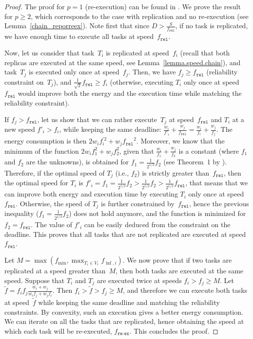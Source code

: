 \documentclass[a4paper]{article}
\theoremstyle{plain}
\theoremstyle{definition}
\theoremstyle{remark}
\newcommand{\fmin}{\ensuremath{f_{\min}}\xspace}
\newcommand{\finf}{\ensuremath{f_{\inf,i}}\xspace}
\newcommand{\fr}{\ensuremath{f_{\texttt{rel}}}\xspace}
\newcommand{\freex}{\ensuremath{f_{\texttt{re-ex}}}\xspace}
\begin{document}
\begin{proof}
  The proof for $p=1$ (re-execution) can be found in \cite{rr7757}.
  We prove the result for $p \geq 2$, which corresponds to the case
  with replication and no re-execution (see
  Lemma~\ref{chain_reporreex}).
Note first that since $D > \frac{S}{\fr}$, if no task is
  replicated, we have enough time to execute all tasks at speed~\fr.

  Now, let us consider that task~$T_i$ is replicated at
  speed~$f_i$ (recall that both replicas are executed at the same
  speed, see Lemma~\ref{lemma.speed.chain}), and task~$T_j$ is executed
  only once at speed~$f_j$. Then, we have
  $f_j\geq\fr$ (reliability constraint on~$T_j$), and 
  $\frac{1}{\sqrt{2}}\fr \geq f_i$ (otherwise, executing $T_i$ only once at speed~\fr would improve
  both the energy and the execution time while matching the
  reliability constraint).

  If $f_j > \fr$, let us show that we can rather execute~$T_j$ at
  speed~$\fr$ and $T_i$ at a new speed $f'_i > f_i$, while keeping the
  same deadline: $\frac{w_i}{f'_i} + \frac{w_j}{\fr} = \frac{w_i}{f_i}
  + \frac{w_j}{f_j}$.  The energy consumption is then $2w_i f_i^{'2} +
  w_j \fr^2$.  Moreover, we know that the minimum of the function
  $2w_i f_1^2 + w_j f_2^2$, given that $\frac{w_i}{f_1} +
  \frac{w_j}{f_2}$ is a constant (where $f_1$ and $f_2$ are the
  unknowns), is obtained for $f_1 = \frac{1}{2^{1/3}}f_2$ (see
  Theorem~1 by \cite{aupy12ccpe}).  Therefore, if the optimal speed of
  $T_j$ (i.e., $f_2$) is strictly greater than~$\fr$, then the optimal
  speed for $T_i$ is $f'_i=f_1 = \frac{1}{2^{1/3}}f_2 >
  \frac{1}{2^{1/2}}f_2 > \frac{1}{2^{1/2}} \fr$, that means that we
  can improve both energy and execution time by executing $T_i$ only
  once at speed~\fr.  Otherwise, the speed of $T_j$ is further
  constrained by~\fr, hence the previous inequality ($f_1 =
  \frac{1}{2^{1/3}}f_2$) does not hold anymore, and the function is
  minimized for $f_2=\fr$. The value of $f'_i$ can be easily deduced
  from the constraint on the deadline.  This proves that all tasks
  that are not replicated are executed at speed~\fr.

  Let $M=\max(\fmin, \max_{T_i \in V_r}\finf)$. We now prove that if two
  tasks are replicated at a speed greater than~$M$, then both tasks
  are executed at the same speed. Suppose that $T_i$ and $T_j$ are executed twice at speeds $f_i > f_j
  \geq M$. Let $\tilde{f} = f_i f_j \frac{w_i+w_j}{w_if_j + w_jf_i}$.
  Then $f_i > \tilde{f} > f_j \geq M$, and therefore we can execute
  both tasks at speed~$\tilde{f}$ while keeping the same deadline and
  matching the reliability constraints. By convexity, such an
  execution gives a better energy consumption. We can iterate on all
  the tasks that are replicated, hence obtaining the speed at which
  each task will be re-executed, \freex. This concludes the proof.
\end{proof}
\end{document}
